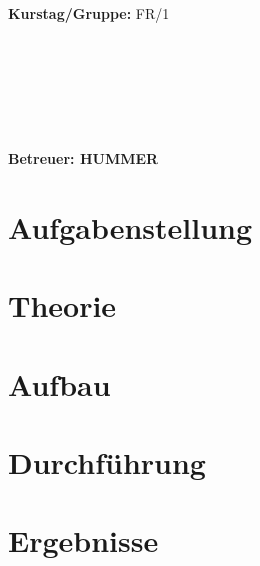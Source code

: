 \documentclass{article}
\begin{document}
\begin{verbatim}


\end{verbatim}
			\begin{flushleft}
			\textbf{\Large{Kurstag/Gruppe:}} \Large{FR/1}
			\end{flushleft}

\begin{verbatim}






\end{verbatim}
			\begin{flushleft}
			\LARGE{\textbf{Betreuer: \Large{HUMMER}}}		
			\end{flushleft}
			
\section{Aufgabenstellung}

\section{Theorie}
\subsection{}

\section{Aufbau}

\section{Durchführung}

\section{Ergebnisse}
\end{document}
